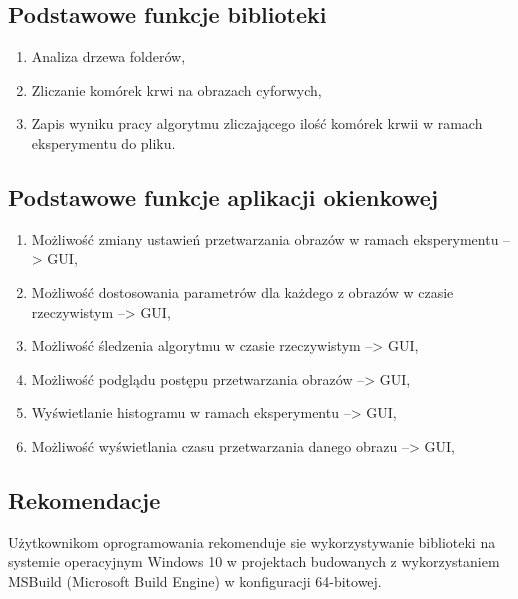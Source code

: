 \documentclass{article}
\begin{document}
        \vspace{0.5cm}
        \subsection{Podstawowe funkcje biblioteki}
        {
            \Large
            \quad
            \begin{enumerate}
                \item Analiza drzewa folderów,
                \item Zliczanie komórek krwi na obrazach cyforwych,
                \item Zapis wyniku pracy algorytmu zliczającego ilość komórek krwii w ramach eksperymentu do pliku.
            \end{enumerate}
        }

        \vspace{0.5cm}
        \subsection{Podstawowe funkcje aplikacji okienkowej}
        {
            \Large
            \quad
            \begin{enumerate}
                \item Możliwość zmiany ustawień przetwarzania obrazów w ramach eksperymentu --> GUI,
                \item Możliwość dostosowania parametrów dla każdego z obrazów w czasie rzeczywistym --> GUI,
                \item Możliwość śledzenia algorytmu w czasie rzeczywistym --> GUI,
                \item Możliwość podglądu postępu przetwarzania obrazów --> GUI,
                \item Wyświetlanie histogramu w ramach eksperymentu --> GUI,
                \item Możliwość wyświetlania czasu przetwarzania danego obrazu --> GUI,
            \end{enumerate}
        }

        \vspace{1cm}
        \subsection{Rekomendacje}
        {
            \Large
            \justifying
            \quad
            Użytkownikom oprogramowania rekomenduje sie wykorzystywanie biblioteki na systemie operacyjnym Windows 10 w projektach budowanych z wykorzystaniem MSBuild (Microsoft Build Engine) w konfiguracji 64-bitowej. \cite{msdocsmsbuild}
        }
    \newpage
\end{document}
